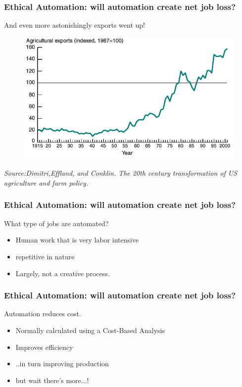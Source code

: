 \begin{frame}
  \frametitle{Ethical Automation: will automation create net job loss? }
  {\Large And even more astonishingly exports went up!}
  \begin{figure}[bht]
    \centering
    \includegraphics[scale= 0.4]{diagrams/agriculture-exports}
  \end{figure}
  \textit{Source:Dimitri,Effland, and Conklin. The 20th century transformation of US agriculture and farm policy.}
\end{frame}

\begin{frame}
  \frametitle{Ethical Automation: will automation create net job loss? }
  {\Large What type of jobs are automated?}
  \begin{itemize}
    \item Human work that is very labor intensive
    \item repetitive in nature
    \item Largely, not a creative process. 
  \end{itemize}
\end{frame}

\begin{frame}
  \frametitle{Ethical Automation: will automation create net job loss? }
  {\Large Automation reduces cost.}
  \begin{itemize}
    \item Normally calculated using a Cost-Based Analysis
    \item Improves efficiency
    \item ..in turn improving production
    \item but wait there's more...!
  \end{itemize}
\end{frame}

